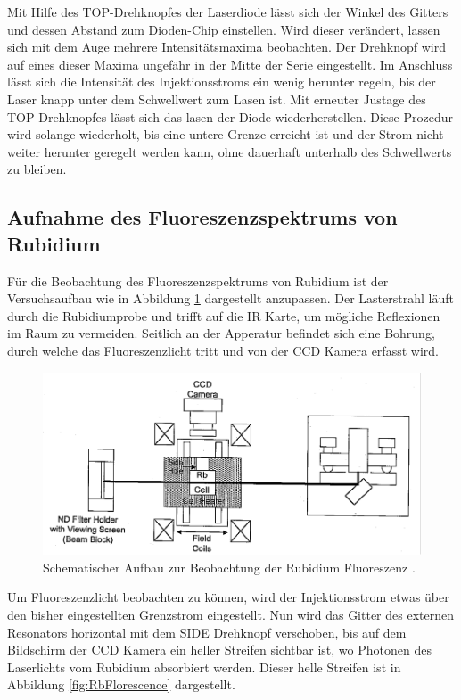 Mit Hilfe des TOP-Drehknopfes der Laserdiode lässt sich der Winkel des Gitters und
dessen Abstand zum Dioden-Chip einstellen.
Wird dieser verändert, lassen sich mit dem Auge mehrere Intensitätsmaxima beobachten.
Der Drehknopf wird auf eines dieser Maxima ungefähr in der Mitte der Serie eingestellt.
Im Anschluss lässt sich die Intensität des Injektionsstroms ein wenig herunter regeln,
bis der Laser knapp unter dem Schwellwert zum Lasen ist.
Mit erneuter Justage des TOP-Drehknopfes lässt sich das lasen der Diode wiederherstellen.
Diese Prozedur wird solange wiederholt, bis eine untere Grenze erreicht ist und der
Strom nicht weiter herunter geregelt werden kann, ohne dauerhaft unterhalb des
Schwellwerts zu bleiben.


\subsection{Aufnahme des Fluoreszenzspektrums von Rubidium}
\label{sec:Rb-Fluoreszenz}

Für die Beobachtung des Fluoreszenzspektrums von Rubidium ist der Versuchsaufbau
wie in Abbildung \ref{fig:RbFlorescenceSetup} dargestellt anzupassen.
Der Lasterstrahl läuft durch die Rubidiumprobe und trifft auf die IR Karte,
um mögliche Reflexionen im Raum zu vermeiden.
Seitlich an der Apperatur befindet sich eine Bohrung, durch welche das
Fluoreszenzlicht tritt und von der CCD Kamera erfasst wird.

\begin{figure}
	\centering
	\includegraphics[width=.8\textwidth, angle=1, origin=c]{images/RbFlorescenceSetup.pdf}
	\caption{Schematischer Aufbau zur Beobachtung der Rubidium Fluoreszenz \cite{anleitung}.}
	\label{fig:RbFlorescenceSetup}
\end{figure}

Um Fluoreszenzlicht beobachten zu können, wird der Injektionsstrom etwas über den
bisher eingestellten Grenzstrom eingestellt.
Nun wird das Gitter des externen Resonators horizontal mit dem SIDE Drehknopf
verschoben, bis auf dem Bildschirm der CCD Kamera ein heller Streifen sichtbar ist,
wo Photonen des Laserlichts vom Rubidium absorbiert werden.
Dieser helle Streifen ist in Abbildung \ref{fig:RbFlorescence} dargestellt.

